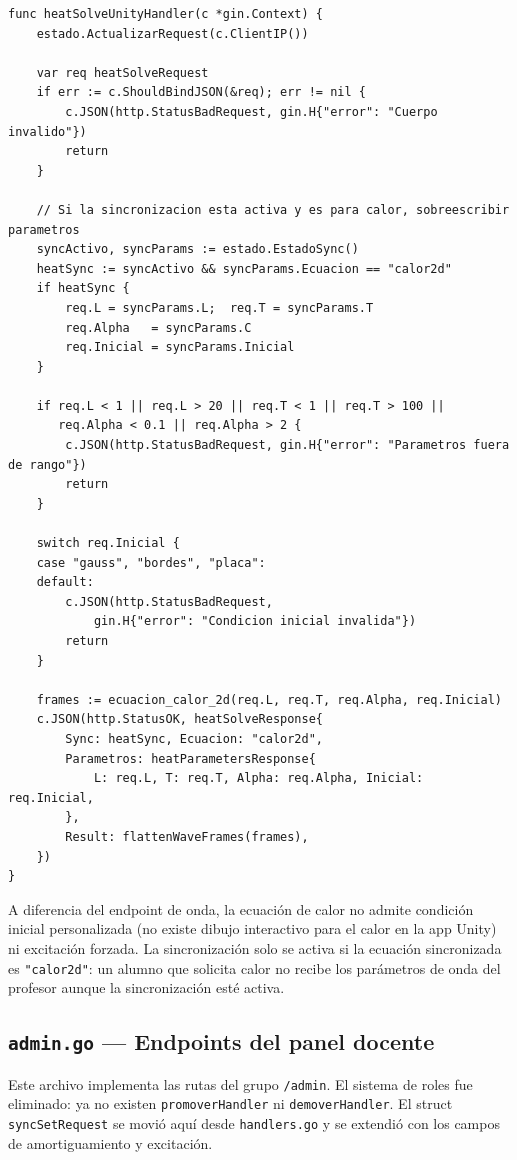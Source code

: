 \documentclass[12pt, a4paper]{article}
\begin{document}
\begin{lstlisting}[style=golang, caption={Validación, cálculo y respuesta de la ecuación de calor}]
func heatSolveUnityHandler(c *gin.Context) {
    estado.ActualizarRequest(c.ClientIP())

    var req heatSolveRequest
    if err := c.ShouldBindJSON(&req); err != nil {
        c.JSON(http.StatusBadRequest, gin.H{"error": "Cuerpo invalido"})
        return
    }

    // Si la sincronizacion esta activa y es para calor, sobreescribir parametros
    syncActivo, syncParams := estado.EstadoSync()
    heatSync := syncActivo && syncParams.Ecuacion == "calor2d"
    if heatSync {
        req.L = syncParams.L;  req.T = syncParams.T
        req.Alpha   = syncParams.C
        req.Inicial = syncParams.Inicial
    }

    if req.L < 1 || req.L > 20 || req.T < 1 || req.T > 100 ||
       req.Alpha < 0.1 || req.Alpha > 2 {
        c.JSON(http.StatusBadRequest, gin.H{"error": "Parametros fuera de rango"})
        return
    }

    switch req.Inicial {
    case "gauss", "bordes", "placa":
    default:
        c.JSON(http.StatusBadRequest,
            gin.H{"error": "Condicion inicial invalida"})
        return
    }

    frames := ecuacion_calor_2d(req.L, req.T, req.Alpha, req.Inicial)
    c.JSON(http.StatusOK, heatSolveResponse{
        Sync: heatSync, Ecuacion: "calor2d",
        Parametros: heatParametersResponse{
            L: req.L, T: req.T, Alpha: req.Alpha, Inicial: req.Inicial,
        },
        Result: flattenWaveFrames(frames),
    })
}
\end{lstlisting}

A diferencia del endpoint de onda, la ecuación de calor no admite condición inicial
personalizada (no existe dibujo interactivo para el calor en la app Unity) ni
excitación forzada. La sincronización solo se activa si la ecuación sincronizada es
\texttt{"calor2d"}: un alumno que solicita calor no recibe los parámetros de onda del
profesor aunque la sincronización esté activa.

\subsection{\texttt{admin.go} — Endpoints del panel docente}

Este archivo implementa las rutas del grupo \texttt{/admin}. El sistema de roles fue
eliminado: ya no existen \texttt{promoverHandler} ni \texttt{demoverHandler}. El struct
\texttt{syncSetRequest} se movió aquí desde \texttt{handlers.go} y se extendió con los
campos de amortiguamiento y excitación.
\end{document}
